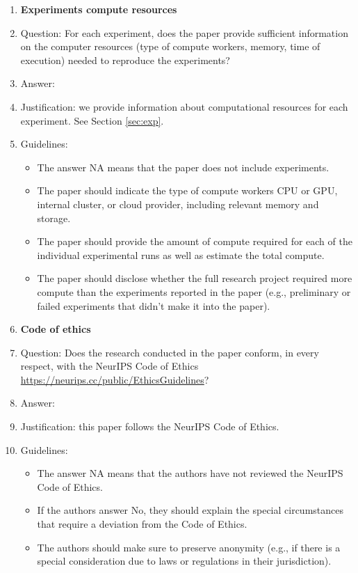\documentclass{article}
\theoremstyle{plain}
\theoremstyle{definition}
\theoremstyle{remark}
\begin{document}
\begin{enumerate}
\item {\bf Experiments compute resources}
    \item[] Question: For each experiment, does the paper provide sufficient information on the computer resources (type of compute workers, memory, time of execution) needed to reproduce the experiments?
    \item[] Answer: \answerYes{} %
    \item[] Justification: we provide information about computational resources for each experiment. See Section \ref{sec:exp}.
    \item[] Guidelines:
    \begin{itemize}
        \item The answer NA means that the paper does not include experiments.
        \item The paper should indicate the type of compute workers CPU or GPU, internal cluster, or cloud provider, including relevant memory and storage.
        \item The paper should provide the amount of compute required for each of the individual experimental runs as well as estimate the total compute. 
        \item The paper should disclose whether the full research project required more compute than the experiments reported in the paper (e.g., preliminary or failed experiments that didn't make it into the paper). 
    \end{itemize}
    
\item {\bf Code of ethics}
    \item[] Question: Does the research conducted in the paper conform, in every respect, with the NeurIPS Code of Ethics \url{https://neurips.cc/public/EthicsGuidelines}?
    \item[] Answer: \answerYes{} %
    \item[] Justification: this paper follows the NeurIPS Code of Ethics.
    \item[] Guidelines:
    \begin{itemize}
        \item The answer NA means that the authors have not reviewed the NeurIPS Code of Ethics.
        \item If the authors answer No, they should explain the special circumstances that require a deviation from the Code of Ethics.
        \item The authors should make sure to preserve anonymity (e.g., if there is a special consideration due to laws or regulations in their jurisdiction).
    \end{itemize}



\end{enumerate}
\end{document}
